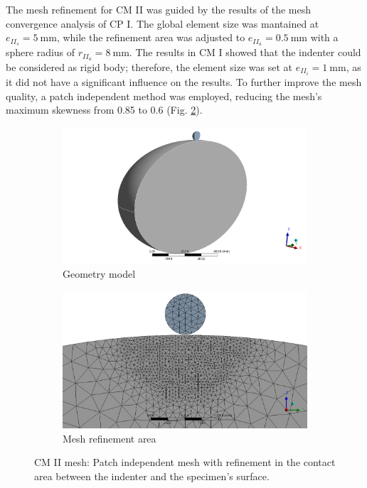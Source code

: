 The mesh refinement for CM II was guided by the results of the mesh convergence analysis of CP I.
The global element size was mantained at $e_{{II}_s}=\SI{5}{\milli\meter}$, while the refinement area
was adjusted to $e_{{II}_a}=\SI{0.5}{\milli\meter}$ with a sphere radius of $r_{{II}_a}=\SI{8}{\milli\meter}$.
The results in CM I showed that the indenter could be considered as rigid body; therefore, the element size was 
set at $e_{{II}_i}=\SI{1}{\milli\meter}$, as it did not have a significant influence on the results.
To further improve the mesh quality, a patch independent method was employed, reducing the mesh's 
maximum skewness from \SI{0.85}{} to \SI{0.6}{} (Fig. \ref{fig:cm2meshref}).
\begin{figure}
    \centering
    \begin{subfigure}[b]{0.45\textwidth}
    \centering
    \includegraphics[width=\textwidth]{Images/computational/cm2geometry.png}
    \caption{Geometry model}
    \label{fig:cm2meshtotal}
    \end{subfigure}
    \hfill
    \begin{subfigure}[b]{0.45\textwidth}
    \centering
    \includegraphics[width=\textwidth]{Images/computational/cm2meshzoom.png}
    \caption{Mesh refinement area}
    \label{fig:cm2meshref}
    \end{subfigure}
    \hspace{0.3cm}
    \caption[Computational model II mesh]{CM II mesh: Patch independent mesh with refinement in the contact area between the indenter and the specimen's surface.}
    \label{fig:cmIImesh}
\end{figure}

